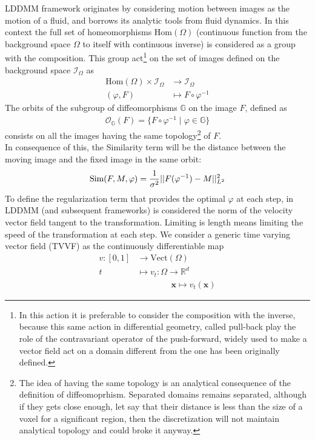 LDDMM \cite{beg2005computing} framework originates by considering motion between images as the motion of a fluid, and borrows its analytic tools from fluid dynamics. In this context the full set of homeomorphisms $\text{Hom}(\Omega)$ (continuous function from the background space $\Omega$ to itself with continuous inverse) is considered as a group with the composition. This group act\footnote{In this action it is preferable to consider the composition with the inverse, because this same action in differential geometry, called pull-back play the role of the contravariant operator of the push-forward, widely used to make a vector field act on a domain different from the one has been originally defined.} on the set of images defined on the background space $\mathcal{I}_{\Omega}$ as
\begin{align*}
\text{Hom}(\Omega) \times \mathcal{I}_{\Omega} & \longrightarrow  \mathcal{I}_{\Omega}   \\
(\varphi,F) &\longmapsto F\circ \varphi^{-1}
\end{align*}
The orbits of the subgroup of diffeomorphisms $\mathbb{G}$ on the image $F$, defined as
\begin{align*}
\mathcal{O}_{\mathbb{G}}(F) = \{ F\circ \varphi^{-1} \mid \varphi \in \mathbb{G} \}
\end{align*}
consists on all the images having the same topology\footnote{The idea of having the same topology is an analytical consequence of the definition of diffeomoprhism. Separated domains remains separated, although if they gets close enough, let say that their distance is less than the size of a voxel for a significant region, then the discretization will not maintain analytical topology and could broke it anyway.} of $F$.\\
In consequence of this, the Similarity term will be the distance between the moving image and the fixed image in the same orbit:
\begin{align*}
\text{Sim}(F,M,\varphi) = \frac{1}{\sigma^2}\vert\lvert F(\varphi^{-1})  - M   \rvert\vert_{L^{2}}^{2}
\end{align*}
To define the regularization term that provides the optimal $\varphi$ at each step, in LDDMM (and subsequent frameworks) is considered the norm of the velocity vector field tangent to the transformation. Limiting is length means limiting the speed of the transformation at each step.
We consider a generic time varying vector field (TVVF) as the continuously differentiable map 
\begin{align*}
v:[0,1] & \longrightarrow  \text{Vect}(\Omega)\\
t  &\longmapsto  v_{t}  : \Omega \longrightarrow   \mathbb{R}^{d} \\
& \qquad \quad \quad \mathbf{x} \longmapsto v_{t}(\mathbf{x} )
\end{align*}
